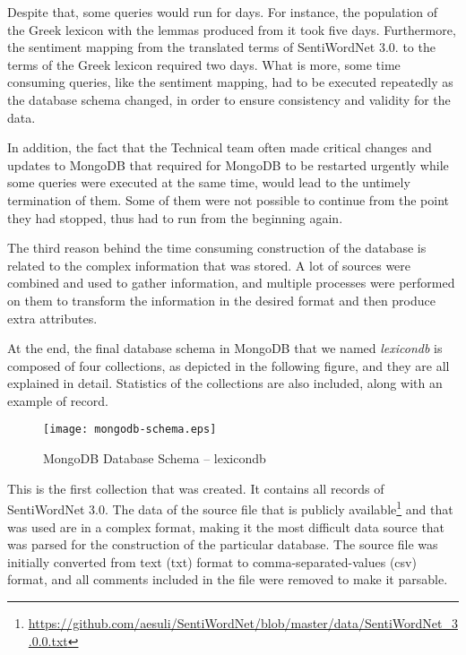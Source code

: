 Despite that, some queries would run for days.
For instance, the population of the Greek lexicon with the lemmas
produced from it took five days.
Furthermore, the sentiment mapping from the translated terms
of SentiWordNet 3.0. to the terms of the Greek lexicon
required two days.
What is more, some time consuming queries, like the sentiment mapping,
had to be executed repeatedly as the database schema changed,
in order to ensure consistency and validity for the data.

In addition,
the fact that the Technical team often made critical changes and updates
to MongoDB that required for MongoDB to be restarted urgently
while some queries were executed at the same time,
would lead to the untimely termination of them.
Some of them were not possible to continue
from the point they had stopped,
thus had to run from the beginning again.

The third reason behind the time consuming construction of the database
is related to the complex information that was stored.
A lot of sources were combined and used to gather information,
and multiple processes were performed on them
to transform the information in the desired format
and then produce extra attributes.

At the end, the final database schema in MongoDB
that we named \emph{lexicondb}
is composed of four collections,
as depicted in the following figure,
and they are all explained in detail.
Statistics of the collections are also included,
along with an example of record.

\begin{figure}[ht]
\centering
\texttt{[image: mongodb-schema.eps]}
\caption{MongoDB Database Schema -- lexicondb}
\label{fig:mongodb-schema}
\end{figure}

\clearpage

\label{subsubsubsec:swn-v3}

This is the first collection that was created.
It contains all records of SentiWordNet 3.0.
The data of the source file that is publicly available\footnote{\url {https://github.com/aesuli/SentiWordNet/blob/master/data/SentiWordNet_3.0.0.txt}}
and that was used are in a complex format,
making it the most difficult data source that was parsed
for the construction of the particular database.
The source file was initially converted
from text (txt) format to comma-separated-values (csv) format,
and all comments included in the file were removed
to make it parsable.

